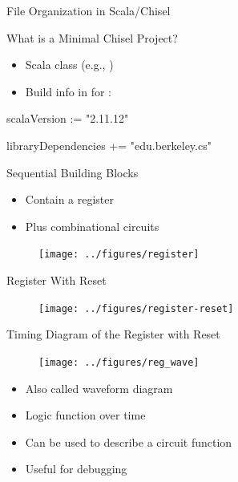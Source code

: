 \begin{frame}[fragile]{File Organization in Scala/Chisel}
\end{frame}

\begin{frame}[fragile]{What is a Minimal Chisel Project?}
\begin{itemize}
\item Scala class (e.g., )
\item Build info in  for :
\end{itemize}
\begin{chisel}
scalaVersion := "2.11.12"

libraryDependencies += "edu.berkeley.cs" %
\end{chisel}
\end{frame}



\begin{frame}[fragile]{Sequential Building Blocks}
\begin{itemize}
\item Contain a register
\item Plus combinational circuits
\end{itemize}
\begin{figure}
  \texttt{[image: ../figures/register]}
\end{figure}
\end{frame}

\begin{frame}[fragile]{Register With Reset}
\begin{figure}
  \texttt{[image: ../figures/register-reset]}
\end{figure}
\end{frame}

\begin{frame}[fragile]{Timing Diagram of the Register with Reset}
\begin{figure}
  \texttt{[image: ../figures/reg\_wave]}
\end{figure}
\begin{itemize}
\item Also called waveform diagram
\item Logic function over time
\item Can be used to describe a circuit function
\item Useful for debugging
\end{itemize}
\end{frame}

